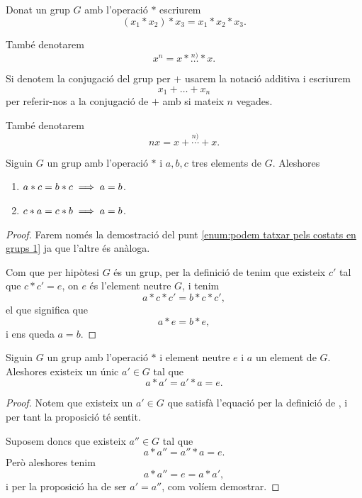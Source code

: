 \documentclass[../../Main.tex]{subfiles}
\begin{document}
	\begin{notation}
		\label{notation:potencies per l'operació repetida en un grup}
		Donat un grup \(G\) amb l'operació \(\ast\) escriurem
		\[(x_{1}\ast x_{2})\ast x_{3}=x_{1}\ast x_{2}\ast x_{3}.\]
		
		També denotarem
		\[x^{n}=x\ast\overset{n)}{\dots}\ast x.\]
		
		Si denotem la conjugació del grup per \(+\) usarem la notació additiva i escriurem
		\[x_{1}+\dots+x_{n}\]
		per referir-nos a la conjugació de \(+\) amb si mateix \(n\) vegades.
		
		També denotarem
		\[nx=x+\overset{n)}{\cdots}+ x.\]
	\end{notation}
	\begin{proposition}
		\label{prop:podem tatxar pels costats en grups}
		Siguin \(G\) un grup amb l'operació \(\ast\) i \(a,b,c\) tres elements de \(G\). Aleshores
		\begin{enumerate}
			\item\label{enum:podem tatxar pels costats en grups 1} \(a\ast c=b\ast c\implies a=b\).
			\item\label{enum:podem tatxar pels costats en grups 2} \(c\ast a=c\ast b\implies a=b\).
		\end{enumerate}
		\begin{proof}
			Farem només la demostració del punt \eqref{enum:podem tatxar pels costats en grups 1} ja que l'altre és anàloga.
			
			Com que per hipòtesi \(G\) és un grup, per la definició de  tenim que existeix \(c'\) tal que \(c\ast c'=e\), on \(e\) és l'element neutre \(G\), i tenim
			\[a\ast c\ast c'=b\ast c\ast c',\]
			el que significa que
			\[a\ast e=b\ast e,\]
			i ens queda \(a=b\).
		\end{proof}
	\end{proposition}
	\begin{proposition}
		\label{prop:unicitat inversa en grups}
		Siguin \(G\) un grup amb l'operació \(\ast\) i element neutre \(e\) i \(a\) un element de \(G\). Aleshores existeix un únic \(a'\in G\) tal que
		\[a\ast a'=a'\ast a=e.\]
		\begin{proof}
			Notem que existeix un \(a'\in G\) que satisfà l'equació per la definició de , i per tant la proposició té sentit.
			
			Suposem doncs que existeix \(a''\in G\) tal que
			\[a\ast a''=a''\ast a=e.\]
			Però aleshores tenim
			\[a\ast a''=e=a\ast a',\]
			i per la proposició  ha de ser \(a'=a''\), com volíem demostrar.
		\end{proof} 
	\end{proposition}
\end{document}
